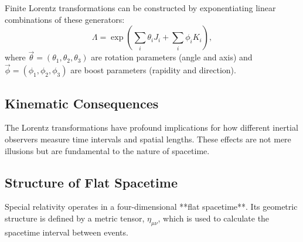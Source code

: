 \documentclass{amsart}
\theoremstyle{definition}
\theoremstyle{remark}
\begin{document}
Finite Lorentz transformations can be constructed by exponentiating linear combinations of these generators:
\begin{equation*}
  \Lambda = \exp\left(\sum_i \theta_i J_i + \sum_i \phi_i K_i \right),
\end{equation*}
where $\vec{\theta} = (\theta_1, \theta_2, \theta_3)$ are rotation parameters (angle and axis) and $\vec{\phi} = (\phi_1, \phi_2, \phi_3)$ are boost parameters (rapidity and direction).

\subsection{Kinematic Consequences}
\label{subsec:sr_kinematics}
The Lorentz transformations have profound implications for how different inertial observers measure time intervals and spatial lengths. These effects are not mere illusions but are fundamental to the nature of spacetime.

\subsection{Structure of Flat Spacetime}
\label{subsec:sr_structure}
Special relativity operates in a four-dimensional **flat spacetime**. Its geometric structure is defined by a metric tensor, $\eta_{\mu\nu}$, which is used to calculate the spacetime interval between events.
\end{document}

